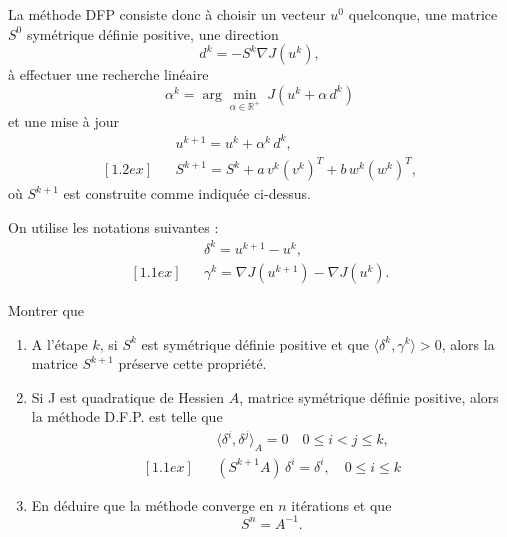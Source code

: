 \documentclass[11pt, a4paper]{article}
\begin{document}
La méthode DFP consiste donc à choisir un vecteur $u^0$ quelconque, une matrice 
$S^0$ symétrique définie positive,  une direction
\[
d^k = -S^k \nabla J(u^k),
\]
à effectuer une recherche linéaire
\[
\alpha^k = \arg \min_{\alpha\in\mathbb{R}^+}\ J(u^k + \alpha \, d^k)
\]
%
et une mise à jour
%
\begin{eqnarray*}
&& u^{k+1} = u^k + \alpha^k\, d^k, \\ [1.2ex]
&& S^{k+1} = S^k + a\, v^k(v^k)^T + b\, w^k (w^k)^T,  
\end{eqnarray*}
%
où $S^{k+1}$ est construite comme indiquée ci-dessus. 

On utilise les notations
suivantes :
%
\begin{eqnarray*}
&& \delta^k = u^{k+1} - u^k, \\ [1.1ex]
&& \gamma^k = \nabla J(u^{k+1}) - \nabla J(u^k).
\end{eqnarray*}
%

Montrer que
\begin{enumerate}
\item A l'étape $k$, si $S^k$ est symétrique définie positive et que $\langle \delta^k,\gamma^k \rangle > 0$, alors la matrice $S^{k+1}$ préserve cette propriété.
\item Si J est quadratique de Hessien $A$, matrice symétrique définie positive, alors la méthode D.F.P. est telle que
%
\begin{eqnarray*}
&& \langle \delta^i,\delta^j \rangle_A = 0\quad 0\leq i < j \leq k, \\ [1.1ex]
&& \left(S^{k+1} A\right)\, \delta^i = \delta^i, \quad 0\leq i\leq k
\end{eqnarray*}
%
\item En déduire que la méthode converge en $n$ itérations et que $$S^n = A^{-1}.$$
%
\end{enumerate}


\end{document}
